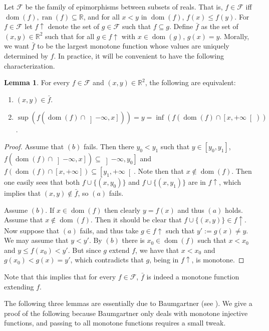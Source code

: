 \documentclass[10pt]{amsart}
\theoremstyle{definition}
\newtheorem{lemma}[theorem]{Lemma}
\theoremstyle{remark}
\newcommand{\seb}{\subseteq}
\newcommand{\1}{\mathbbm{1}}
\newcommand{\sF}{\mathscr{F}}
\DeclareMathOperator{\dom}{dom}
\DeclareMathOperator{\ran}{ran}
\begin{document}
Let $\sF$ be the family of epimorphisms between subsets of reals. That
is, $f \in \sF$ iff $\dom(f),\ran(f) \seb \mathbb{R}$, and for all $x
< y$ in $\dom(f)$, $f(x) \le f(y)$.  For $f \in \sF$ let $f
\!\uparrow$ denote the set of $g \in \sF$ such that $f \seb g$. Define
$\bar{f}$ as the set of $(x,y) \in \mathbb{R}^{2}$ such that for all
$g \in f\!\uparrow$ with $x \in \dom(g)$, $g(x) = y$. Morally, we want
$\bar{f}$ to be the largest monotone function whose values are
uniquely determined by $f$. In practice, it will be convenient to have the
following characterization.


\begin{lemma}\label{lem:hatf-char}
  For every $f \in \sF$ and $(x,y) \in \mathbb{R}^{2}$, the following are equivalent:
  \begin{enumerate}[label=(\alph*)]\itemsep0em
    \item $(x,y) \in \bar{f}$.
    \item $\sup(f (\dom(f) \cap \left]-\infty,x\right])) =
    y = \inf(f (\dom(f) \cap \left[x,+\infty\right[))$.
  \end{enumerate}
\end{lemma}
\begin{proof}
  Assume that
  $(b)$ fails. Then there
  $y_{0} < y_{1}$ such that $y \in [y_{0},y_{1}]$,
  $f (\dom(f) \cap \left]-\infty,x\right]) \seb \left]-\infty, y_{0}\right]$ and
  $f (\dom(f) \cap \left[x,+\infty\right]) \seb \left[y_{1}, +\infty\right[$.
  Note then that $x \notin \dom(f)$.
  Then one easily sees that both $f \cup \{(x,y_{0})\}$ and
  $f \cup \{(x,y_{1})\}$ are in $f\!\uparrow$, which implies
  that $(x,y) \notin \bar{f}$, so $(a)$ fails.

  Assume $(b)$. If $x \in \dom(f)$ then clearly $y = f(x)$ and thus
  $(a)$ holds. Assume
  that $x \notin \dom(f)$. Then it
  should be clear that $f \cup \{(x,y)\} \in f \!\uparrow$.
  Now suppose that $(a)$ fails, and thus take $g \in f\!\uparrow$ such that
  $y' := g(x) \neq y$. We may assume that $y < y'$. By $(b)$ there is
  $x_{0} \in \dom(f)$ such that $x < x_{0}$ and $y \le f(x_{0}) < y'$. But since $g$ extend $f$,
  we have that $x < x_{0}$ and $g(x_{0}) < g(x) = y'$, which contradicts that
  $g$, being in $f\!\uparrow$, is monotone.
\end{proof}

Note that this implies that for every $f \in \sF$,
$\bar{f}$ is indeed a monotone function extending $f$.


The following three lemmas are essentially due to Baumgartner (see
\cite{Baumgartner1982}). We give a proof of the following because
Baumgartner only deals with monotone injective functions, and
passing to all monotone functions requires a small tweak.
\end{document}
